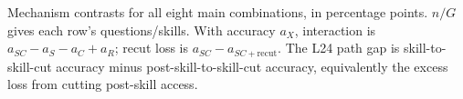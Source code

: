 \begin{table}[t]
\centering
\caption{Mechanism contrasts for all eight main combinations, in percentage points.
$n/G$ gives each row's questions/skills. With accuracy $a_X$, interaction is
$a_{SC}-a_S-a_C+a_R$; recut loss is $a_{SC}-a_{SC+\mathrm{recut}}$.
The L24 path gap is skill-to-skill-cut accuracy minus post-skill-to-skill-cut
accuracy, equivalently the excess loss from cutting post-skill access.}
\label{tab:mechanism-contrasts}
\setlength{\tabcolsep}{3pt}

\end{table}
